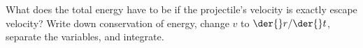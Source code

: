 What does the total energy have to
be if the projectile's velocity is exactly escape velocity? Write down conservation
of energy, change $v$ to $\der{}r/\der{}t$, separate the variables, and integrate.



